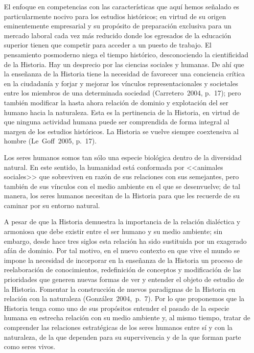El enfoque en competencias con las características que aquí hemos 
señala\-do es particularmente nocivo para los estudios históricos; en 
virtud  de su origen eminentemente empresarial y su propósito de 
preparación exclusiva para un mercado laboral cada vez más reducido 
donde los egresados de la educación superior tienen que competir para 
acceder a un puesto de trabajo. El pensamiento posmoderno niega el 
tiempo histórico, desconociendo la cientificidad de la Historia. Hay un 
desprecio por las ciencias sociales y humanas. De ahí que la enseñanza 
de la Historia tiene la necesidad de favorecer una conciencia crítica 
en la ciudadanía y forjar y mejorar los vínculos representacionales y 
societales entre los miembros de una determinada sociedad 
(\mbox{Carretero~2004,} p.~17); pero también modificar la hasta ahora relación de dominio y 
explotación del ser humano hacia la naturaleza. Esta es la pertinencia 
de la Historia, en virtud de que ninguna actividad humana puede ser 
comprendida de forma integral al margen de los estudios históricos. La 
Historia se vuelve siempre coextensiva al hombre (Le~Goff~2005, p.~17). 

Los seres humanos somos tan sólo una especie biológica dentro de la 
diversidad natural. En este sentido, la humanidad está conformada por 
<<animales sociales>> que sobreviven  en razón de sus relaciones con sus 
semejantes, pero también de sus vínculos con el medio ambiente en el 
que se desenvuelve; de tal manera, los seres humanos necesitan de la 
Historia  para que les recuerde de su caminar por su entorno natural.

A pesar de que la Historia demuestra la importancia de la relación 
dialéctica y armoniosa que debe existir entre el ser humano y su medio 
ambiente; sin embargo, desde hace tres siglos esta relación ha sido 
sustituida por un exagerado afán de dominio. Por tal motivo, en el 
nuevo contexto en que vive el mundo se impone la necesidad de 
incorporar en la enseñanza de la Historia un proceso de reelaboración 
de conocimientos, redefinición de conceptos y modificación de las 
prioridades que generen nuevas formas de ver y entender  el objeto de 
estudio de la Historia. Fomentar la construcción de nuevos paradigmas 
de la Historia en relación con la naturaleza (González~2004,~p.~7). Por 
lo que proponemos que la Historia tenga como uno de sus propósitos 
entender el pasado de la especie humana en estrecha relación con su 
medio ambiente y, al mismo tiempo, tratar de comprender las relaciones 
estratégicas de los seres humanos entre sí y con la naturaleza, de la 
que dependen para su supervivencia y de la que forman parte como seres 
vivos.


